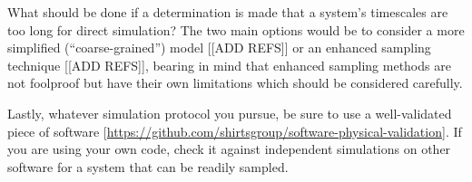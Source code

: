 What should be done if a determination is made that a system's timescales are too long for direct simulation?
The two main options would be to consider a more simplified (``coarse-grained'') model {\color{red}[[ADD REFS]]} or an enhanced sampling technique {\color{red}[[ADD REFS]]}, bearing in mind that enhanced sampling methods are not foolproof but have their own limitations which should be considered carefully.

Lastly, whatever simulation protocol you pursue, be sure to use a well-validated piece of software [\url{https://github.com/shirtsgroup/software-physical-validation}].
If you are using your own code, check it against independent simulations on other software for a system that can be readily sampled.

